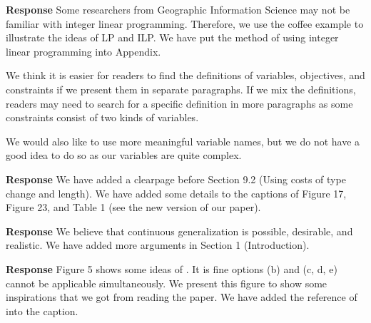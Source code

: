 \documentclass[a4paper,twoside,11pt]{reviewresponse}
\begin{document}
\textbf{Response}
Some researchers from Geographic Information Science 
may not be familiar with integer linear programming.
Therefore, we use the coffee example to illustrate the ideas of LP and ILP.
We have put the method of using integer linear programming into Appendix.

We think it is easier for readers 
to find the definitions of variables, objectives, and constraints
if we present them in separate paragraphs.
If we mix the definitions, readers may need to search for a specific definition 
in more paragraphs as some constraints consist of two kinds of variables.

We would also like to use more meaningful variable names, 
but we do not have a good idea to do so as our variables are quite complex.



\textbf{Response} We have added a clearpage before 
Section 9.2 (Using costs of type change and length).
We have added some details to the captions of 
Figure 17, Figure 23, and Table 1 (see the new version of our paper).





\textbf{Response} We believe that continuous generalization is possible,
desirable, and realistic. 
We have added more arguments in Section 1 (Introduction).



\textbf{Response} Figure 5 shows some ideas of \textcite{Cheng2006}.
It is fine options (b) and (c, d, e) cannot be applicable simultaneously.
We present this figure to show some inspirations that we got from reading the paper.
We have added the reference of \textcite{Cheng2006} into the caption.


\end{document}
